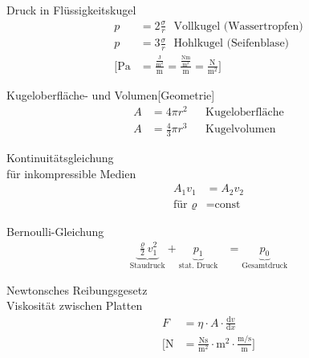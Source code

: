 \begin{karte}{Druck in Flüssigkeitskugel}
    \begin{align*}
        p &= 2\frac{\sigma}{r} \text{~~Vollkugel (Wassertropfen)}\\
        p &= 3\frac{\sigma}{r} \text{~~Hohlkugel (Seifenblase)} \\
        \Bigg[ \si{\pascal} &= \frac{\frac{\si{\joule}}{\si{\square\meter}}}{\si{\meter}}  = \frac{\frac{\si{\newton\meter}}{\si{\square\meter}}}{\si{\meter}}  = \frac{\si{\newton}}{\si{\square\meter}} \Bigg]
    \end{align*}
\end{karte}

\begin{karte}{Kugeloberfläche- und Volumen}[Geometrie]
    \begin{align*}
        A &= 4\pi r^2 &&\text{Kugeloberfläche} \\
        A &= \frac{4}{3}\pi r^3 &&\text{Kugelvolumen}
    \end{align*}
\end{karte}

\begin{karte}{Kontinuitätsgleichung\\für inkompressible Medien}
    \begin{align*}
        A_1 v_1 &= A_2 v_2 \\
        \text{für } \varrho &= \text{const}
    \end{align*}
\end{karte}

\begin{karte}{Bernoulli-Gleichung}
    \begin{align*}
        \underbrace{\frac{\varrho}{2}v_1^2}_\text{Staudruck} + \underbrace{p_1}_\text{stat. Druck} &= \underbrace{p_0}_\text{Gesamtdruck}
    \end{align*}
\end{karte}

\begin{karte}{Newtonsches Reibungsgesetz \\  Viskosität zwischen Platten}
    \begin{align*}
        F  &=  \eta \cdot A \cdot \frac{\mathrm dv}{\mathrm dx} \\
        \bigg[ \si{\newton} &= \frac{\si{\newton\second}}{\si{\square\meter}} \cdot \si{\square\meter} \cdot \frac{\si{\meter\per\second}}{\si{\meter}} 
            \bigg]
    \end{align*}
\end{karte}

